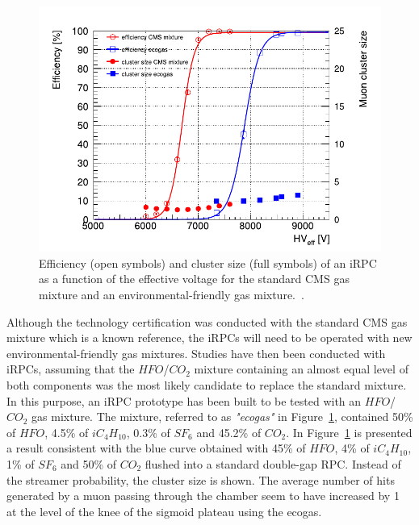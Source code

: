 \begingroup\setlength{\intextsep}{5pt}\setlength{\columnsep}{15pt}

	\begin{figure}
		\centering
		\includegraphics[width=\linewidth]{fig/chapt3/iRPC-HFO-mixture.pdf}
		\caption{\label{fig:iRPC-eco} Efficiency (open symbols) and cluster size (full symbols) of an iRPC as a function of the effective voltage for the standard CMS gas mixture and an environmental-friendly gas mixture.~\cite{PHASEIITP}.}
	\end{figure}
	
	Although the technology certification was conducted with the standard CMS gas mixture which is a known reference, the iRPCs will need to be operated with new environmental-friendly gas mixtures. Studies have then been conducted with iRPCs, assuming that the $HFO$/$CO_2$ mixture containing an almost equal level of both components was the most likely candidate to replace the standard mixture. In this purpose, an iRPC prototype has been built to be tested with an $HFO$/$CO_2$ gas mixture. The mixture, referred to as \textit{"ecogas"} in Figure~\ref{fig:iRPC-eco}, contained 50\% of $HFO$, 4.5\% of $iC_4H_{10}$, 0.3\% of $SF_6$ and 45.2\% of $CO_2$. In Figure~\ref{fig:iRPC-eco} is presented a result consistent with the blue curve obtained with 45\% of $HFO$, 4\% of $iC_4H_{10}$, 1\% of $SF_6$ and 50\% of $CO_2$ flushed into a standard double-gap RPC. Instead of the streamer probability, the cluster size is shown. The average number of hits generated by a muon passing through the chamber seem to have increased by 1 at the level of the knee of the sigmoid plateau using the ecogas.
	
\endgroup

\clearpage{\pagestyle{empty}\cleardoublepage}